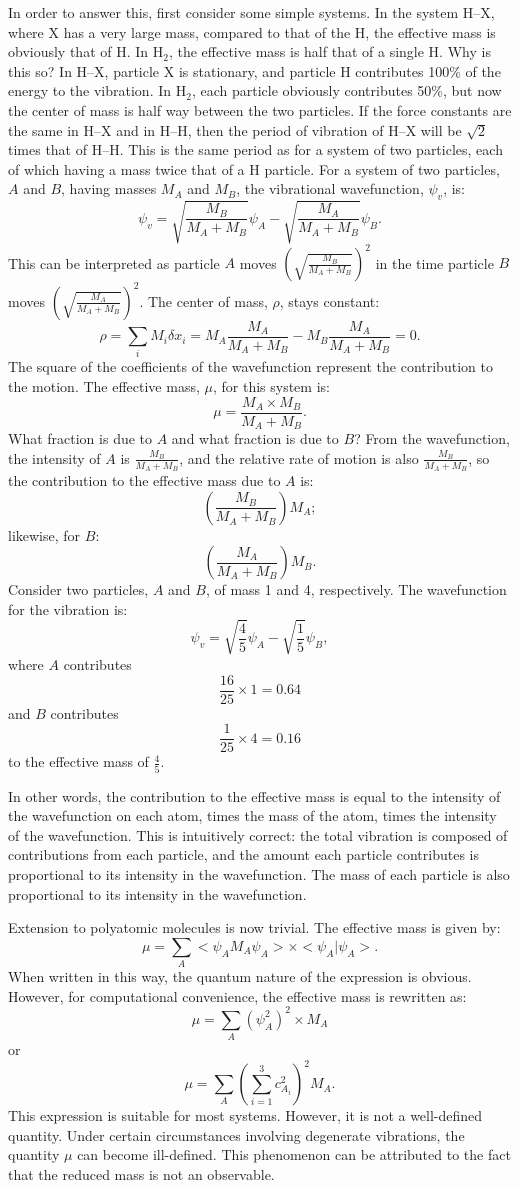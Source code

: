 In order to answer this, first consider some simple systems.  In the system
H--X, where X has a very large mass, compared to that of the H,  the effective
mass is obviously that of H.  In H$_2$, the effective mass is half that of a
single H.   Why is this so?  In H--X, particle X is stationary, and particle H
contributes 100\% of the energy to the vibration.  In H$_2$, each particle
obviously contributes 50\%, but now the center of mass is half way between the
two particles.  If the force constants are the same in H--X and in H--H, then
the period of vibration of H--X will be $\sqrt{2}$ times that of H--H.  This is
the same period as for a system of two particles, each of which having a mass
twice that of a H particle.  For a system of two particles, $A$ and $B$, having
masses $M_A$ and $M_B$,  the vibrational wavefunction, $\psi_v$, is:
$$
\psi_v=\sqrt{\frac{M_B}{M_A+M_B}}\psi_A-\sqrt{\frac{M_A}{M_A+M_B}}\psi_B.
$$
This can be interpreted as particle $A$ moves $(\sqrt{\frac{M_B}{M_A+M_B}})^2$
in the time particle $B$ moves $(\sqrt{\frac{M_A}{M_A+M_B}})^2$.  The center of
mass, $\rho$, stays constant:
$$
\rho=\sum_iM_i\delta x_i = M_A\frac{M_A}{M_A+M_B}- M_B\frac{M_A}{M_A+M_B} = 0.
$$
The square of the coefficients of the wavefunction represent the contribution
to the motion.  The effective mass, $\mu$, for this system is:
$$
\mu = \frac{M_A\times M_B}{M_A+M_B}.
$$
What fraction is due to $A$ and what fraction is due to $B$?  From the
wavefunction, the intensity of $A$ is $\frac{M_B}{M_A+M_B}$, and the relative
rate of motion is also $\frac{M_B}{M_A+M_B}$, so the contribution to the
effective mass due to $A$ is:
$$
(\frac{M_B}{M_A+M_B})M_A;
$$
likewise, for $B$:
$$
(\frac{M_A}{M_A+M_B})M_B.
$$
Consider two particles, $A$ and $B$, of mass 1 and 4, respectively.   The
wavefunction for the vibration is:
$$
\psi_v = \sqrt{\frac{4}{5}}\psi_A-\sqrt{\frac{1}{5}}\psi_B,
$$
where $A$ contributes
$$
\frac{16}{25}\times 1 = 0.64
$$
and $B$ contributes
$$
\frac{1}{25}\times 4 = 0.16
$$
to the effective mass of $\frac{4}{5}$.

In other words, the contribution to the effective mass is equal to the
intensity of the wavefunction on each atom, times the mass of the atom, times
the intensity of the wavefunction.  This is intuitively correct:  the total
vibration is composed of contributions from each particle, and the amount each
particle contributes is proportional to its intensity in the wavefunction.  The
mass of each particle is also proportional to its intensity in the
wavefunction.

Extension to polyatomic molecules is now trivial.  The effective mass is given
by:
$$
\mu = \sum_A <\!\psi_AM_A\psi_A\!>\times <\!\psi_A|\psi_A\!>.
$$
When written in this way, the quantum nature of the expression is obvious.
However, for computational convenience, the effective mass is rewritten as:
$$
\mu = \sum_A(\psi_A^2)^2\times M_A
$$
or
$$
\mu = \sum_A(\sum_{i=1}^3c_{A_i}^2)^2M_A.
$$
This expression is suitable for most systems.  However, it is not a
well-defined quantity.  Under certain circumstances involving degenerate
vibrations, the quantity $\mu$ can become ill-defined.  This phenomenon can be
attributed to the  fact that the reduced mass is not an observable.

